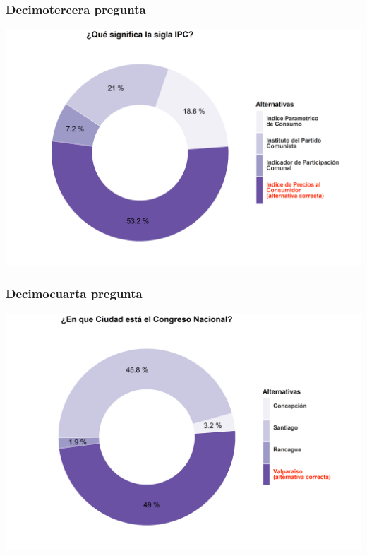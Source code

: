 \documentclass[
  14pt,
]{book}
\begin{document}
\hypertarget{decimotercera-pregunta}{%
\subsubsection{Decimotercera pregunta}\label{decimotercera-pregunta}}

\begin{center}\includegraphics[width=52.49in]{images/ccivico_13} \end{center}

\hypertarget{decimocuarta-pregunta}{%
\subsubsection{Decimocuarta pregunta}\label{decimocuarta-pregunta}}

\begin{center}\includegraphics[width=52.49in]{images/ccivico_14} \end{center}
\end{document}
